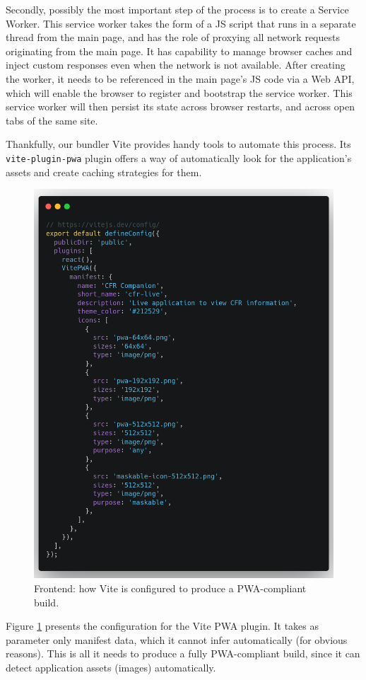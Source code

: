 Secondly, possibly the most important step of the process is to create a Service Worker. This service worker takes the form of a JS script that runs in a separate thread from the main page, and has the role of proxying all network requests originating from the main page. It has capability to manage browser caches and inject custom responses even when the network is not available. After creating the worker, it needs to be referenced in the main page's JS code via a Web API, which will enable the browser to register and bootstrap the service worker. This service worker will then persist its state across browser restarts, and across open tabs of the same site.

Thankfully, our bundler Vite provides handy tools to automate this process. Its \verb|vite-plugin-pwa| plugin offers a way of automatically look for the application's assets and create caching strategies for them.

\begin{figure}[htbp]
    \centering
    \includegraphics[width=.7\textwidth]{./figures/code/fe_vite-config.png}
    \caption{Frontend: how Vite is configured to produce a PWA-compliant build.}
    \label{FigFeViteConfig}
\end{figure}

Figure \ref{FigFeViteConfig} presents the configuration for the Vite PWA plugin. It takes as parameter only manifest data, which it cannot infer automatically (for obvious reasons). This is all it needs to produce a fully PWA-compliant build, since it can detect application assets (images) automatically.

